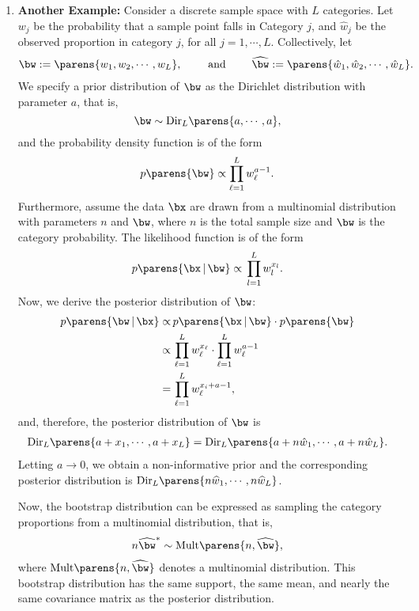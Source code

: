 \documentclass[12pt]{article}
\begin{document}
\begin{enumerate}[label=\textbf{\arabic*.}]
	\item \textbf{Another Example:} Consider a discrete sample space with $L$ categories. Let $w_j$ be the probability that a sample point falls in Category $j$, and $\hat{w}_j$ be the observed proportion in category $j$, for all $j = 1, \cdots, L$. Collectively, let 
	\begin{align}
		\bw := \parens{w_1, w_2, \cdots, w_L}, \hspace{20pt} \text{ and } \hspace{20pt} \widehat{\bw} := \parens{\hat{w}_1, \hat{w}_2, \cdots, \hat{w}_L}. 
	\end{align}
	We specify a prior distribution of $\bw$ as the Dirichlet distribution with parameter $a$, that is, 
	\begin{equation}
		\bw \sim \mathrm{Dir}_L \parens{a, \cdots, a}, 
	\end{equation}
	and the probability density function is of the form 
	\begin{equation}
		p \parens{\bw} \propto \prod_{\ell = 1}^L w_{\ell}^{a-1}. 
	\end{equation}
	Furthermore, assume the data $\bx$ are drawn from a multinomial distribution with parameters $n$ and $\bw$, where $n$ is the total sample size and $\bw$ is the category probability. The likelihood function is of the form 
	\begin{equation}
		p \parens{\bx \,\vert\, \bw} \propto \, \prod_{l=1}^L w_l^{x_l}. 
	\end{equation}
	Now, we derive the posterior distribution of $\bw$: 
	\begin{align*}
		p \parens{\bw \,\vert\, \bx} \propto & \, p \parens{\bx \,\vert\, \bw} \cdot p \parens{\bw} \\ 
		\propto & \, \prod_{\ell=1}^L w_{\ell}^{x_{\ell}} \cdot \prod_{\ell = 1}^L w_{\ell}^{a-1} \\ 
		= & \, \prod_{\ell=1}^L w_{\ell}^{x_i + a - 1}, 
	\end{align*}
	and, therefore, the posterior distribution of $\bw$ is 
	\begin{align}	
		\mathrm{Dir}_L \parens{ a + x_1, \cdots, a + x_L} = \text{Dir}_L \parens{a + n \hat{w}_1, \cdots, a + n \hat{w}_L}. 
	\end{align}
	Letting $a \to 0$, we obtain a non-informative prior and the corresponding posterior distribution is $\mathrm{Dir}_L \parens{n \widehat{w}_1, \cdots, n \widehat{w}_L}$. 
	
	Now, the bootstrap distribution can be expressed as sampling the category proportions from a multinomial distribution, that is, 
	\begin{align}
		n \widehat{\bw}^* \sim \mathrm{Mult} \parens{n, \widehat{\bw}}, 
	\end{align}
	where $\mathrm{Mult} \parens{n, \widehat{\bw}}$ denotes a multinomial distribution. This bootstrap distribution has the same support, the same mean, and nearly the same covariance matrix as the posterior distribution. %
	

\end{enumerate}
\end{document}
